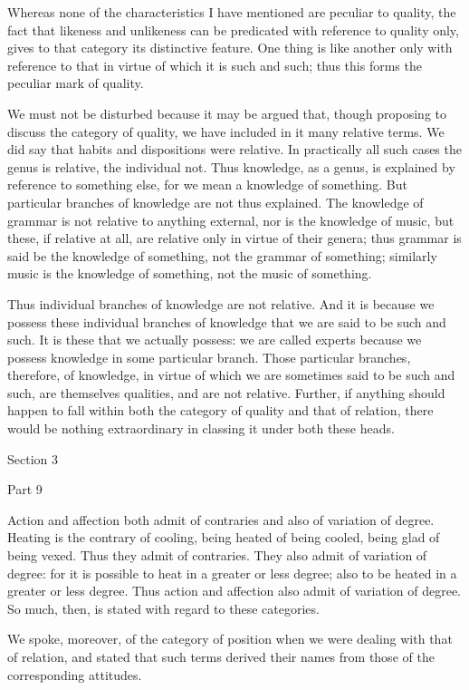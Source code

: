 Whereas none of the characteristics I have mentioned are peculiar to
quality, the fact that likeness and unlikeness can be predicated with
reference to quality only, gives to that category its distinctive
feature. One thing is like another only with reference to that in
virtue of which it is such and such; thus this forms the peculiar mark
of quality.

We must not be disturbed because it may be argued that, though
proposing to discuss the category of quality, we have included in it
many relative terms. We did say that habits and dispositions were
relative. In practically all such cases the genus is relative, the
individual not. Thus knowledge, as a genus, is explained by reference
to something else, for we mean a knowledge of something. But particular
branches of knowledge are not thus explained. The knowledge of grammar
is not relative to anything external, nor is the knowledge of music,
but these, if relative at all, are relative only in virtue of their
genera; thus grammar is said be the knowledge of something, not the
grammar of something; similarly music is the knowledge of something,
not the music of something.

Thus individual branches of knowledge are not relative. And it is
because we possess these individual branches of knowledge that we are
said to be such and such. It is these that we actually possess: we are
called experts because we possess knowledge in some particular branch.
Those particular branches, therefore, of knowledge, in virtue of which
we are sometimes said to be such and such, are themselves qualities,
and are not relative. Further, if anything should happen to fall within
both the category of quality and that of relation, there would be
nothing extraordinary in classing it under both these heads.



Section 3


Part 9

Action and affection both admit of contraries and also of variation of
degree. Heating is the contrary of cooling, being heated of being
cooled, being glad of being vexed. Thus they admit of contraries. They
also admit of variation of degree: for it is possible to heat in a
greater or less degree; also to be heated in a greater or less degree.
Thus action and affection also admit of variation of degree. So much,
then, is stated with regard to these categories.

We spoke, moreover, of the category of position when we were dealing
with that of relation, and stated that such terms derived their names
from those of the corresponding attitudes.

